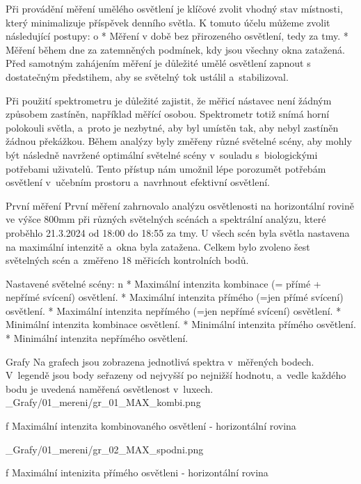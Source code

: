 \medskip
Při provádění měření umělého osvětlení je klíčové zvolit vhodný stav místnosti,
který minimalizuje příspěvek denního světla. K tomuto účelu můžeme zvolit následující postupy:
\medskip
\begitems \style o
    * Měření v době bez přirozeného osvětlení, tedy za tmy.
    * Měření během dne za zatemněných podmínek, kdy jsou všechny okna zatažená.
\enditems
\medskip
Před samotným zahájením měření je důležité umělé osvětlení zapnout s dostatečným předstihem, aby se světelný tok ustálil a~stabilizoval.

Při použití spektrometru je důležité zajistit, že měřicí nástavec není žádným způsobem zastíněn,
například měřící osobou. Spektrometr totiž snímá horní polokouli světla, a~proto je nezbytné, aby byl umístěn tak, aby nebyl zastíněn žádnou překážkou.
\medskip
Během analýzy byly změřeny různé světelné scény, aby mohly být následně navržené optimální světelné scény
v~souladu s~biologickými potřebami uživatelů. Tento přístup nám umožnil lépe porozumět potřebám osvětlení
v~učebním prostoru a~navrhnout efektivní osvětlení.%

\sec První měření
První měření zahrnovalo analýzu osvětlenosti na horizontální rovině ve výšce 800mm při různých světelných scénách a spektrální analýzu,
které proběhlo 21.3.2024 od 18:00 do 18:55 za tmy. U všech scén byla světla nastavena na maximální intenzitě a~okna byla zatažena.
Celkem bylo zvoleno šest světelných scén a~změřeno 18 měřicích kontrolních bodů.

\medskip\noindent
{\sbf Nastavené světelné scény:}
\begitems \style n
    * Maximální intenzita kombinace (= přímé + nepřímé svícení) osvětlení.
    * Maximální intenzita přímého (=jen přímé svícení) osvětlení.
    * Maximální intenzita nepřímého (=jen nepřímé svícení) osvětlení.
    * Minimální intenzita kombinace osvětlení.
    * Minimální intenzita přímého osvětlení.
    * Minimální intenzita nepřímého osvětlení.
\enditems

\secc Grafy
Na grafech jsou zobrazena jednotlivá spektra v~měřených bodech. V~legendě jsou body seřazeny od nejvyšší
po nejnižší hodnotu, a~vedle každého bodu je uvedená naměřená osvětlenost v~luxech.
\medskip {}
\picw=15cm _Grafy/01_mereni/gr_01_MAX_kombi.png
\caption/f Maximální intenzita kombinovaného osvětlení - horizontální rovina

\medskip {}
\picw=15cm _Grafy/01_mereni/gr_02_MAX_spodni.png
\caption/f Maximální intenizita přímého osvětleni - horizontální rovina

